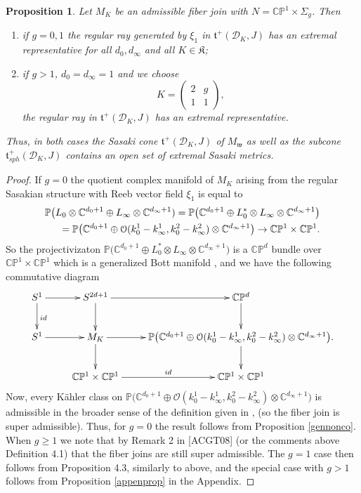 \documentclass[12pt]{amsart}
\newtheorem{proposition}[theorem]{Proposition}
\def\bbc{{\mathbb C}}
\def\bbp{{\mathbb P}}
\def\grS{\Sigma}
\def\calo{{\mathcal O}}
\def\cald{{\mathcal D}}
\def\calo{{\mathcal O}}
\def\gt{{\mathfrak t}}
\def\gw{{\mathfrak w}}
\def\gK{{\mathfrak K}}
\begin{document}
\begin{proposition}\label{speccaseprop}
Let $M_K$ be an admissible fiber join with $N=\bbc\bbp^1\times \grS_g$. Then
\begin{enumerate}
\item if $g=0,1$ the regular ray generated by $\xi_1$ in $\gt^+(\cald_K,J)$ has an extremal representative for all $d_0,d_\infty$ and all $K\in\gK$;
\item if $g>1$, $d_0=d_\infty=1$ and we choose 
\begin{equation*}\label{specextrmatrix2}
K= \begin{pmatrix}
     2 & g \\
     1 & 1
\end{pmatrix},
\end{equation*}
the regular ray in $\gt^+(\cald_K,J)$ has an extremal representative.
\end{enumerate}
Thus, in both cases the Sasaki cone $\gt^+(\cald_K,J)$ of $M_\gw$ as well as the subcone $\gt^+_{sph}(\cald_K,J)$ contains an open set of extremal Sasaki metrics.
\end{proposition}

\begin{proof}
If $g=0$ the quotient complex manifold of $M_K$  arising from the regular Sasakian structure with Reeb vector field $\xi_1$ is equal to 
\begin{eqnarray}\label{KSprojeqn} \notag
\bbp\bigl(L_0\otimes \bbc^{d_0+1}\oplus L_\infty \otimes \bbc^{d_\infty+1}) = \bbp\bigl(\bbc^{d_0+1} \oplus L^*_0\otimes L_\infty\otimes \bbc^{d_\infty+1}\bigr) \\  
= \bbp\bigl(\bbc^{d_0+1}\oplus \calo(k^1_0-k^1_\infty,k^2_0-k^2_\infty)\otimes \bbc^{d_\infty+1}\bigr) \rightarrow \bbc\bbp^1\times\bbc\bbp^1. 
\end{eqnarray}
So the projectivizaton $\bbp\bigl(\bbc^{d_0+1} \oplus L^*_0\otimes L_\infty\otimes \bbc^{d_\infty+1}\bigr)$ is a $\bbc\bbp^d$ bundle over $\bbc\bbp^1\times\bbc\bbp^1$ which is a generalized Bott manifold \cite{ChMaSu10}, and we have the following commutative diagram
\begin{equation}\label{bundiag2}
\xymatrix{
S^1\ar[d]^{id} \ar[r]  &S^{2d+1}\ar[d] \ar[r] &\bbc\bbp^d \ar[d]  \\
               S^1 \ar[r]&M_K \ar[r] \ar[d] &\bbp\bigl(\bbc^{d_0+1}\oplus \calo(k^1_0-k^1_\infty,k^2_0-k^2_\infty)\otimes \bbc^{d_\infty+1}\bigr).\ar[d]  \\
& \bbc\bbp^1\times \bbc\bbp^1 \ar[r]^{id}  &\bbc\bbp^1\times \bbc\bbp^1}
\end{equation}
Now, every K\"ahler class on $\bbp\bigl(\bbc^{d_0+1}\oplus \calo(k^1_0-k^1_\infty,k^2_0-k^2_\infty)\otimes \bbc^{d_\infty+1}\bigr)$ is admissible in the broader sense of the definition given in \cite{ACGT08}, (so the fiber join is super admissible). Thus, for $g=0$ the result  follows from Proposition \ref{gennonco}.  
        When $g\geq 1$ we note that by Remark 2 in [ACGT08] (or the comments above Definition 4.1) that the fiber joins are still super admissible. The $g=1$ case then follows from Proposition 4.3, similarly to above, and the special case with $g>1$ follows from Proposition \ref{appenprop} in the Appendix.
\end{proof}
\end{document}
